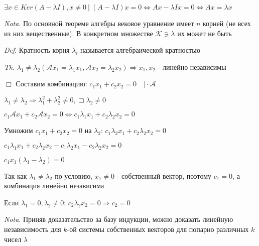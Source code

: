\documentclass[12pt]{article}
\begin{document}
    $\exists x \in Ker(A - \lambda I), x \neq 0 \ | \ (A - \lambda I) x = 0 \Longleftrightarrow Ax - \lambda I x = 0 \Longleftrightarrow Ax = \lambda x$

    \vspace{3mm}
\textit{Nota}. По основной теореме алгебры вековое уравнение имеет $n$ корней (не всех из них вещественные).
    В конкретном множестве $\mathcal{K} \ni \lambda$ их может не быть

    \vspace{3mm}
\textit{Def}. Кратность корня $\lambda_i$ называется алгебраической кратностью

    \vspace{3mm}
\textit{Th}. $\lambda_1 \neq \lambda_2 (\mathcal{A}x_1 = \lambda_1 x_1, \mathcal{A}x_2 = \lambda_2 x_2) \Longrightarrow x_1, x_2$ - линейно независимы

    $\Box$ Составим комбинацию: $c_1 x_1 + c_2 x_2 = 0 \quad \Big| \cdot \mathcal{A}$

    $\lambda_1 \neq \lambda_2 \Longrightarrow \lambda_1^2 + \lambda_2^2 \neq 0, \sqsupset \lambda_2 \neq 0$

    $c_1 \mathcal{A} x_1 + c_2 \mathcal{A} x_2 = 0 \Longleftrightarrow c_1 \lambda_1 x_1 + c_2 \lambda_2 x_2 = 0$

    Умножим $c_1 x_1 + c_2 x_2 = 0$ на $\lambda_2$: $c_1 \lambda_2 x_1 + c_2 \lambda_2 x_2 = 0$

    $c_1 \lambda_1 x_1 + c_2 \lambda_2 x_2 - c_1 \lambda_2 x_1 - c_2 \lambda_2 x_2 = 0$

    $c_1 x_1(\lambda_1 - \lambda_2) = 0$

    Так как $\lambda_1 \neq \lambda_2$ по условию, $x_1 \neq 0$ - собственный вектор, поэтому $c_1 = 0$, а комбинация линейно независима

    Если $\lambda_1 = 0, \lambda_2 \neq 0$: $c_2 \lambda_2 x_2 = 0 \Longrightarrow c_2 = 0$

    \vspace{3mm}
\textit{Nota}. Приняв доказательство за базу индукции, можно доказать линейную независимость для $k$-ой системы собственных векторов для попарно различных $k$ чисел $\lambda$
\end{document}
